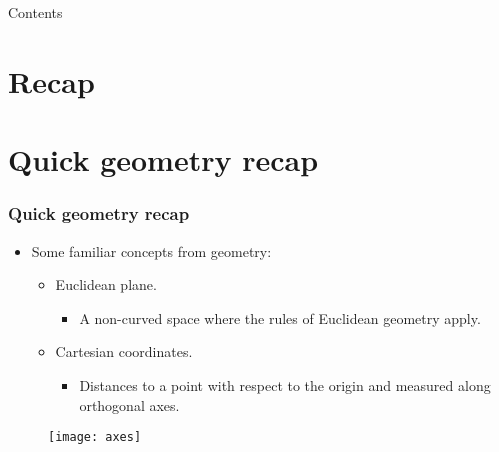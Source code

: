 


\subtitle{Image Formation -- Part II}





\begin{frame}
\titlepage %
\end{frame}


\begin{frame}{Contents}
\setcounter{tocdepth}{1}
\tableofcontents
\end{frame}


\section{Recap}

\section{Quick geometry recap}

\begin{frame}
\frametitle{Quick geometry recap}
\begin{itemize}
\item Some familiar concepts from geometry:
\begin{itemize}
\item Euclidean plane.
\begin{itemize}
\item A non-curved space where the rules of Euclidean geometry apply.
\end{itemize}
\item Cartesian coordinates.
\begin{itemize}
\item Distances to a point with respect to the origin and measured along orthogonal axes.
\end{itemize}
\end{itemize}
\end{itemize}
\begin{figure}[!h]
\centering
\texttt{[image: axes]}
\end{figure}
\end{frame}

